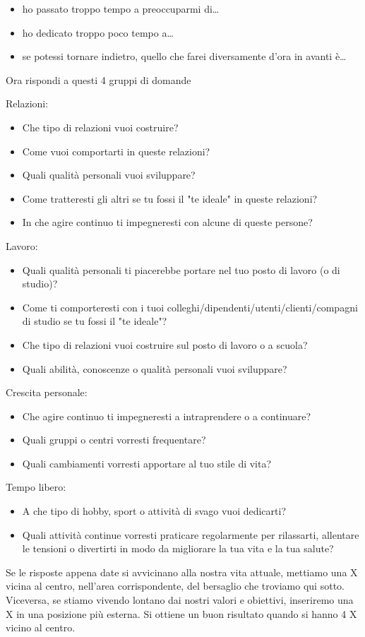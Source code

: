 \documentclass[12pt]{book} %
\begin{document}
\begin{itemize}
\item ho passato troppo tempo a preoccuparmi di… 
\item ho dedicato troppo poco tempo a… 
\item se potessi tornare indietro, quello che farei diversamente d'ora in avanti è…
\end{itemize}

Ora rispondi a questi 4 gruppi di domande

Relazioni:

\begin{itemize}
\item Che tipo di relazioni vuoi costruire? 
\item Come vuoi comportarti in queste relazioni? 
\item Quali qualità personali vuoi sviluppare? 
\item Come tratteresti gli altri se tu fossi il "te ideale" in queste
relazioni? 
\item In che agire continuo ti impegneresti con alcune di queste persone?
\end{itemize}
Lavoro:

\begin{itemize}
\item Quali qualità personali ti piacerebbe portare nel tuo posto di lavoro (o di studio)? 
\item Come ti comporteresti con i tuoi colleghi/dipendenti/utenti/clienti/compagni di studio se tu fossi il
"te ideale"? 
\item Che tipo di relazioni vuoi costruire sul posto di lavoro o a scuola? 
\item Quali abilità, conoscenze o qualità personali vuoi sviluppare?
\end{itemize}
Crescita personale:

\begin{itemize}
\item Che agire continuo ti impegneresti a intraprendere o a continuare? 
\item Quali gruppi o centri vorresti frequentare? 
\item Quali cambiamenti vorresti apportare al tuo stile di vita?
\end{itemize}
Tempo libero: 

\begin{itemize}
\item A che tipo di hobby, sport o attività di svago vuoi dedicarti? 
\item Quali attività continue vorresti praticare regolarmente per rilassarti, allentare le tensioni o divertirti in modo
da migliorare la tua vita e la tua salute?
\end{itemize}
Se le risposte appena date si avvicinano alla nostra vita attuale, mettiamo una X vicina al centro,
nell'area corrispondente, del bersaglio che troviamo qui sotto. Viceversa, se stiamo vivendo
lontano dai nostri valori e obiettivi, inseriremo una X in una posizione più esterna. Si ottiene un buon risultato quando si hanno 4 X vicino al centro.
\end{document}
